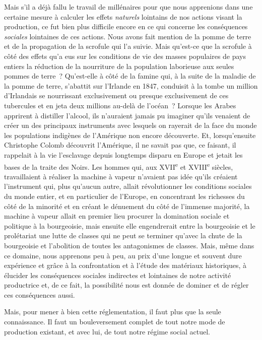 \documentclass[french,twoside]{book} %
\begin{document}
Mais s’il a déjà fallu le travail de millénaires pour que nous apprenions dans une certaine mesure à calculer les effets \emph{naturels} lointains de nos actions visant la production, ce fut bien plus difficile encore en ce qui concerne les conséquences \emph{sociales} lointaines de ces actions. Nous avons fait mention de la pomme de terre et de la propagation de la scrofule qui l’a suivie. Mais qu’est-ce que la scrofule à côté des effets qu’a eus sur les conditions de vie des masses populaires de pays entiers la réduction de la nourriture de la population laborieuse aux seules pommes de terre ? Qu’est-elle à côté de la famine qui, à la suite de la maladie de la pomme de terre, s’abattit sur l’Irlande en 1847, conduisit à la tombe un million d’Irlandais se nourrissant exclusivement ou presque exclusivement de ces tubercules et en jeta deux millions au-delà de l’océan ? Lorsque les Arabes apprirent à distiller l’alcool, ils n’auraient jamais pu imaginer qu’ils venaient de créer un des principaux instruments avec lesquels on rayerait de la face du monde les populations indigènes de l’Amérique non encore découverte. Et, lorsqu’ensuite Christophe Colomb découvrit l’Amérique, il ne savait pas que, ce faisant, il rappelait à la vie l’esclavage depuis longtemps disparu en Europe et jetait les bases de la traite des Noirs. Les hommes qui, aux XVII\textsuperscript{e} et XVIII\textsuperscript{e} siècles, travaillaient à réaliser la machine à vapeur n’avaient pas idée qu’ils créaient l’instrument qui, plus qu’aucun autre, allait révolutionner les conditions sociales du monde entier, et en particulier de l’Europe, en concentrant les richesses du côté de la minorité et en créant le dénuement du côté de l’immense majorité, la machine à vapeur allait en premier lieu procurer la domination sociale et politique à la bourgeoisie, mais ensuite elle engendrerait entre la bourgeoisie et le prolétariat une lutte de classes qui ne peut se terminer qu’avec la chute de la bourgeoisie et l’abolition de toutes les antagonismes de classes. Mais, même dans ce domaine, nous apprenons peu à peu, au prix d’une longue et souvent dure expérience et grâce à la confrontation et à l’étude des matériaux historiques, à élucider les conséquences sociales indirectes et lointaines de notre activité productrice et, de ce fait, la possibilité nous est donnée de dominer et de régler ces conséquences aussi.\par
Mais, pour mener à bien cette réglementation, il faut plus que la seule connaissance. Il faut un bouleversement complet de tout notre mode de production existant, et avec lui, de tout notre régime social actuel.\par
\end{document}
